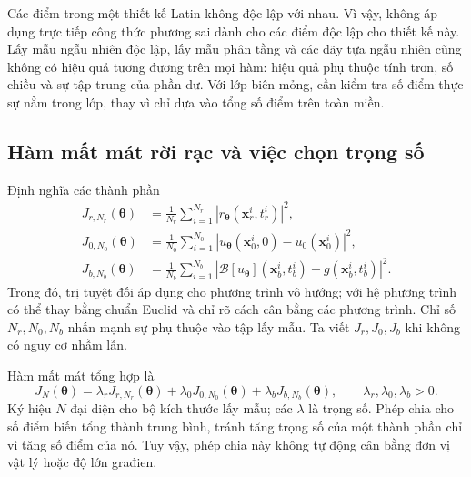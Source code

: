 Các điểm trong một thiết kế Latin không độc lập với nhau. Vì vậy,
không áp dụng trực tiếp công thức phương sai dành cho các điểm độc lập
cho thiết kế này. Lấy mẫu ngẫu nhiên độc lập, lấy mẫu phân tầng và các
dãy tựa ngẫu nhiên cũng không có hiệu quả tương đương trên mọi hàm:
hiệu quả phụ thuộc tính trơn, số chiều và sự tập trung của phần dư.
Với lớp biên mỏng, cần kiểm tra số điểm thực sự nằm trong lớp, thay vì
chỉ dựa vào tổng số điểm trên toàn miền.

\subsection{Hàm mất mát rời rạc và việc chọn trọng số}

Định nghĩa các thành phần
\begin{align}
 J_{r,N_r}(\boldsymbol{\theta})
 &=\frac{1}{N_r}\sum_{i=1}^{N_r}
       |r_{\boldsymbol{\theta}}(\mathbf{x}_r^i,t_r^i)|^2,
       \label{p4:eq:loss-r}\\
 J_{0,N_0}(\boldsymbol{\theta})
 &=\frac{1}{N_0}\sum_{i=1}^{N_0}
       |u_{\boldsymbol{\theta}}(\mathbf{x}_0^i,0)-u_0(\mathbf{x}_0^i)|^2,
       \label{p4:eq:loss-0}\\
 J_{b,N_b}(\boldsymbol{\theta})
 &=\frac{1}{N_b}\sum_{i=1}^{N_b}
       |\mathcal{B}[u_{\boldsymbol{\theta}}](\mathbf{x}_b^i,t_b^i)
                                  -g(\mathbf{x}_b^i,t_b^i)|^2.
       \label{p4:eq:loss-b}
\end{align}
Trong đó, trị tuyệt đối áp dụng cho phương trình vô hướng; với hệ
phương trình có thể thay bằng chuẩn Euclid và chỉ rõ cách cân bằng
các phương trình. Chỉ số $N_r,N_0,N_b$ nhấn mạnh sự phụ thuộc vào tập
lấy mẫu. Ta viết $J_r,J_0,J_b$ khi không có nguy cơ nhầm lẫn.

Hàm mất mát tổng hợp là
\begin{equation}
 J_N(\boldsymbol{\theta})=
 \lambda_rJ_{r,N_r}(\boldsymbol{\theta})+
 \lambda_0J_{0,N_0}(\boldsymbol{\theta})+
 \lambda_bJ_{b,N_b}(\boldsymbol{\theta}),
 \qquad \lambda_r,\lambda_0,\lambda_b>0.
 \label{p4:eq:loss-total}
\end{equation}
Ký hiệu $N$ đại diện cho bộ kích thước lấy mẫu; các $\lambda$ là trọng
số. Phép chia cho số điểm biến tổng thành trung bình, tránh tăng trọng
số của một thành phần chỉ vì tăng số điểm của nó. Tuy vậy, phép chia
này không tự động cân bằng đơn vị vật lý hoặc độ lớn građien.

